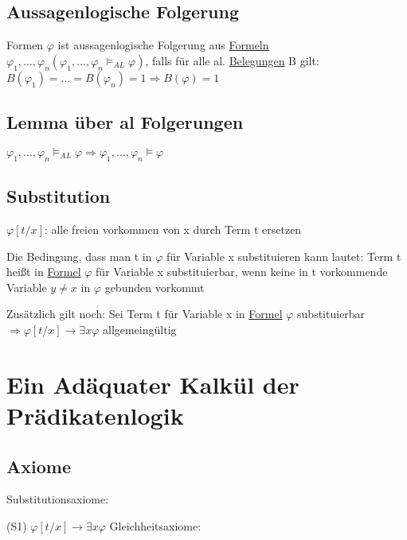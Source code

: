 \documentclass[12pt,a4paper]{article} %
\begin{document}
	\subsection{Aussagenlogische Folgerung}
	Formen $\varphi$ ist aussagenlogische Folgerung aus \hyperref[Formel]{Formeln} \newline 
	$\varphi_1, ..., \varphi_n (\varphi_1, ..., \varphi_n \hyperref[Erfullbar]{\vDash_{AL}} \varphi)$, falls für alle al. \hyperref[Belegung]{Belegungen} B gilt: \newline
	$B(\varphi_1) = ... = B(\varphi_n) = 1 \Rightarrow B(\varphi) = 1$
	
	\subsection{Lemma über al Folgerungen}
	$\varphi_1, ..., \varphi_n \hyperref[Erfullbar]{\vDash_{AL}} \varphi \Rightarrow \varphi_1, ..., \varphi_n \hyperref[Erfullbar]{\vDash} \varphi$
	
	\subsection{Substitution}
	\label{Substituierbar}
	$\varphi[t/x]$: alle freien vorkommen von x durch Term t ersetzen
	
	Die Bedingung, dass man t in $\varphi$ für Variable x substituieren kann lautet: \newline 
	Term t heißt in \hyperref[Formel]{Formel} $\varphi$ für Variable x substituierbar, wenn keine in t vorkommende Variable $y \ne x$ in $\varphi$ gebunden vorkommt
	
	Zusätzlich gilt noch: Sei Term t für Variable x in \hyperref[Formel]{Formel} $\varphi$ substituierbar \newline 
	$\Rightarrow \varphi[t/x] \rightarrow \exists x \varphi$ allgemeingültig
	
	\section{Ein Adäquater Kalkül der Prädikatenlogik}
	
	\subsection{Axiome}
	Substitutionsaxiome:
	
	(S1) $\varphi[t/x] \rightarrow \exists x \varphi$
	\newline	
	Gleichheitsaxiome:
	
\end{document}
